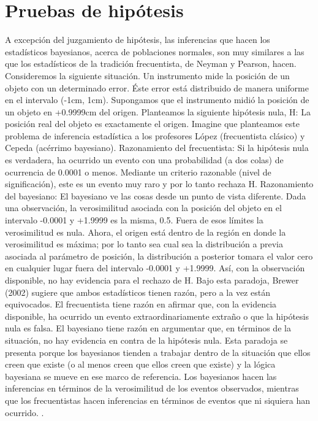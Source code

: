 \section{Pruebas de hipótesis}

A excepción del juzgamiento de hipótesis, las inferencias que hacen los estadísticos bayesianos, acerca de poblaciones normales, son muy similares a las que los estadísticos de la tradición frecuentista, de Neyman y Pearson, hacen.
Consideremos la siguiente situación. Un instrumento mide la posición de un objeto con un determinado error. Éste error está distribuido de manera uniforme en el intervalo (-1cm, 1cm). Supongamos que el instrumento midió la posición de un objeto en +0.9999cm del origen. Planteamos la siguiente hipótesis nula, H: La posición real del objeto es exactamente el origen. Imagine que planteamos este problema de inferencia estadística a los profesores López (frecuentista clásico) y Cepeda (acérrimo bayesiano).
Razonamiento del frecuentista: Si la hipótesis nula es verdadera, ha ocurrido un evento con una probabilidad (a dos colas) de ocurrencia de 0.0001 o menos. Mediante un criterio razonable (nivel de significación), este es un evento muy raro y por lo tanto rechaza H.
Razonamiento del bayesiano: El bayesiano ve las cosas desde un punto de vista diferente. Dada una observación, la verosimilitud asociada con la posición del objeto en el intervalo -0.0001 y +1.9999 es la misma, 0.5. Fuera de esos límites la verosimilitud es nula. Ahora, el origen está dentro de la región en donde la verosimilitud es máxima; por lo tanto sea cual sea la distribución a previa asociada al parámetro de posición, la distribución a posterior tomara el valor cero en cualquier lugar fuera del intervalo -0.0001 y +1.9999. Así, con la observación disponible, no hay evidencia para el rechazo de H.
Bajo esta paradoja, Brewer (2002) sugiere que ambos estadísticos tienen razón, pero a la vez están equivocados. El frecuentista tiene razón en afirmar que, con la evidencia disponible, ha ocurrido un evento extraordinariamente extraño o que la hipótesis nula es falsa. El bayesiano tiene razón en argumentar que, en términos de la situación, no hay evidencia en contra de la hipótesis nula.
Esta paradoja se presenta porque los bayesianos tienden a trabajar dentro de la situación que ellos creen que existe (o al menos creen que ellos creen que existe) y la lógica bayesiana se mueve en ese marco de referencia. Los bayesianos hacen las inferencias en términos de la verosimilitud de los eventos observados, mientras que los frecuentistas hacen inferencias en términos de eventos que ni siquiera han ocurrido. .

